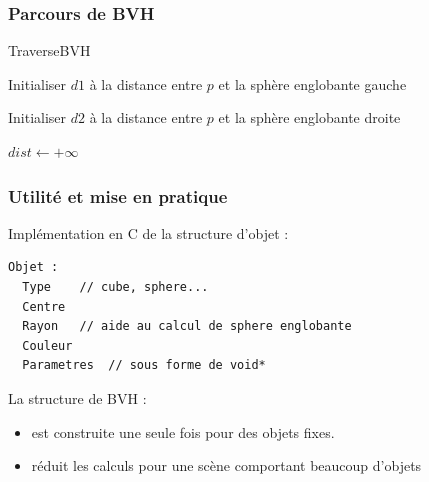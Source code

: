 \begin{frame}[fragile]
\frametitle{Parcours de BVH\esp}
\tiny 
\begin{algorithm}[H]
    \caption{\textsf{TraverseBVH}}
    \BlankLine
    Initialiser $d1$ à la distance entre $p$ et la sphère englobante gauche\;

    Initialiser $d2$ à la distance entre $p$ et la sphère englobante droite\;

    $dist \gets +\infty$\;
\end{algorithm}
\end{frame}


\begin{frame}[fragile]
\frametitle{Utilité et mise en pratique}

Implémentation en C de la structure d'objet :
\begin{lstlisting}[c]
Objet :
  Type    // cube, sphere...
  Centre          
  Rayon   // aide au calcul de sphere englobante
  Couleur
  Parametres  // sous forme de void*
\end{lstlisting}
\medskip

La structure de BVH :
\begin{itemize}
    \item est construite une seule fois pour des objets fixes.
    \item réduit les calculs pour une scène comportant beaucoup d'objets
\end{itemize}

\end{frame}


